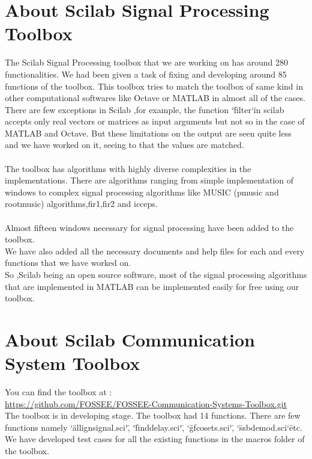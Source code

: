 \documentclass[12pt,a4paper]{report}
\begin{document}
\section{About Scilab Signal Processing Toolbox}
The Scilab Signal Processing toolbox that we are working on has around 280 functionalities. We had been given a task of fixing and developing around 85 functions of the toolbox. 
This toolbox tries to match the toolbox of same kind in other computational softwares like Octave\cite{oct} or MATLAB\cite{matdoc} in almost all of the cases. There are few exceptions in Scilab ,for example, the function \char`\"filter\char`\" in scilab accepts only real vectors or matrices as input arguments but not so in the case of MATLAB and Octave. But these limitations on the output are seen quite less and we have worked on it, seeing to that the values are matched. \\
\\
The toolbox has algorithms with highly diverse complexities in the implementations. There are algorithms ranging from simple implementation of windows to complex signal processing algorithms like MUSIC (pmusic and rootmusic) algorithms,fir1,fir2 and icceps.
\\
\\
Almost fifteen windows\cite{wind} necessary for signal processing have been added to the toolbox. \\
We have also added all the necessary documents and help files for each and every functions that we have worked on.\\
So ,Scilab being an open source software, most of the signal processing algorithms that are implemented in MATLAB can be implemented easily for free using our toolbox.  




\section{About Scilab Communication System Toolbox}
 You can find the toolbox at : \\
 \url{ https://github.com/FOSSEE/FOSSEE-Communication-Systems-Toolbox.git}\\

The toolbox is in developing stage. The toolbox had 14 functions. There are few functions namely  \char`\"allignsignal.sci\char`\" , \char`\" finddelay.sci\char`\" , \char`\" gfcosets.sci\char`\" , \char`\" ssbdemod.sci\char`\"   etc. We have developed test cases for all the existing functions in the macros folder of the toolbox.\\
\end{document}
